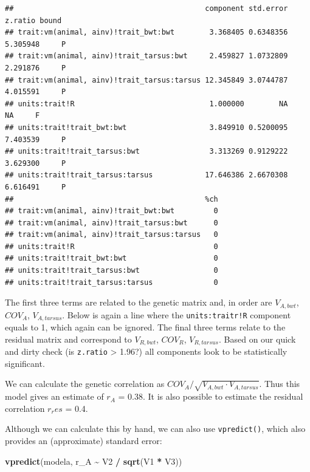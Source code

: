 \documentclass[
  12pt,
]{book}
\newenvironment{Shaded}{\begin{snugshade}}{\end{snugshade}}
\newcommand{\KeywordTok}[1]{\textcolor[rgb]{0.13,0.29,0.53}{\textbf{#1}}}
\newcommand{\NormalTok}[1]{#1}
\newcommand{\OperatorTok}[1]{\textcolor[rgb]{0.81,0.36,0.00}{\textbf{#1}}}
\newcommand{\StringTok}[1]{\textcolor[rgb]{0.31,0.60,0.02}{#1}}
\begin{document}
\begin{verbatim}
##                                            component std.error  z.ratio bound
## trait:vm(animal, ainv)!trait_bwt:bwt        3.368405 0.6348356 5.305948     P
## trait:vm(animal, ainv)!trait_tarsus:bwt     2.459827 1.0732809 2.291876     P
## trait:vm(animal, ainv)!trait_tarsus:tarsus 12.345849 3.0744787 4.015591     P
## units:trait!R                               1.000000        NA       NA     F
## units:trait!trait_bwt:bwt                   3.849910 0.5200095 7.403539     P
## units:trait!trait_tarsus:bwt                3.313269 0.9129222 3.629300     P
## units:trait!trait_tarsus:tarsus            17.646386 2.6670308 6.616491     P
##                                            %ch
## trait:vm(animal, ainv)!trait_bwt:bwt         0
## trait:vm(animal, ainv)!trait_tarsus:bwt      0
## trait:vm(animal, ainv)!trait_tarsus:tarsus   0
## units:trait!R                                0
## units:trait!trait_bwt:bwt                    0
## units:trait!trait_tarsus:bwt                 0
## units:trait!trait_tarsus:tarsus              0
\end{verbatim}

The first three terms are related to the genetic matrix and, in order are \(V_{A,bwt}\), \(COV_A\), \(V_{A, tarsus}\). Below is again a line where the \texttt{units:traitr!R} component equals to 1, which again can be ignored. The final three terms relate to the residual matrix and correspond to \(V_{R,bwt}\), \(COV_R\), \(V_{R,tarsus}\). Based on our quick and dirty check (is \texttt{z.ratio} \textgreater{} 1.96?) all components look to be statistically significant.

We can calculate the genetic correlation as \(COV_A / \sqrt{V_{A,bwt} \cdot V_{A,tarsus}}\). Thus this model gives an estimate of \(r_A\) = 0.38. It is also possible to estimate the residual correlation \(r_res\) = 0.4.

Although we can calculate this by hand, we can also use \texttt{vpredict()}, which also provides an (approximate) standard error:

\begin{Shaded}
\begin{Highlighting}[]
\KeywordTok{vpredict}\NormalTok{(modela, r\_A }\OperatorTok{\textasciitilde{}}\StringTok{ }\NormalTok{V2 }\OperatorTok{/}\StringTok{ }\KeywordTok{sqrt}\NormalTok{(V1 }\OperatorTok{*}\StringTok{ }\NormalTok{V3))}
\end{Highlighting}
\end{Shaded}
\end{document}
